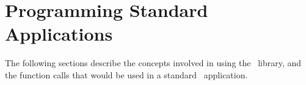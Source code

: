 %
\section{Programming Standard Applications}
\label{standard-applications}

The following sections describe the concepts involved in using the
\Zephyr\ library, and the function calls that would be used in a
standard \Zephyr\ application.


















